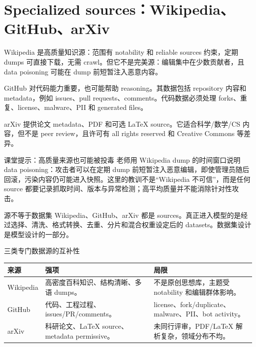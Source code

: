 \section{Specialized sources：Wikipedia、GitHub、arXiv}

Wikipedia 是高质量知识源：范围有 notability 和 reliable sources 约束，定期 dumps 可直接下载，无需 crawl。但它不是完美源：编辑集中在少数贡献者，且 data poisoning 可能在 dump 前短暂注入恶意内容。

GitHub 对代码能力重要，也可能帮助 reasoning。其数据包括 repository 内容和 metadata，例如 issues、pull requests、comments。代码数据必须处理 forks、重复、license、malware、PII 和 generated files。

arXiv 提供论文 metadata、PDF 和可选 LaTeX source。它适合科学/数学/CS 内容，但不是 peer review，且许可有 all rights reserved 和 Creative Commons 等差异。

\begin{warningbox}{课堂提示：高质量来源也可能被投毒}
老师用 Wikipedia dump 的时间窗口说明 data poisoning：攻击者可以在定期 dump 前短暂注入恶意编辑，即使管理员随后回滚，污染内容仍可能进入快照。这里的教训不是“Wikipedia 不可信”，而是任何 source 都要记录抓取时间、版本与异常检测；高平均质量并不能消除针对性攻击。
\end{warningbox}

\begin{importantbox}{源不等于数据集}
Wikipedia、GitHub、arXiv 都是 sources。真正进入模型的是经过选择、清洗、格式转换、去重、分片和混合权重设定后的 datasets。数据集设计是模型设计的一部分。
\end{importantbox}

\begin{knowledgebox}{三类专门数据源的互补性}
\begin{tabular}{L{0.18\textwidth}L{0.32\textwidth}L{0.4\textwidth}}
\toprule
来源 & 强项 & 局限 \\
\midrule
Wikipedia & 高密度百科知识、结构清晰、多语 dumps。 & 不是原创思想库，主题受 notability 和编辑群体影响。 \\
GitHub & 代码、工程过程、issues/PR/comments。 & license、fork/duplicate、malware、PII、bot activity。 \\
arXiv & 科研论文、LaTeX source、metadata permissive。 & 未同行评审，PDF/LaTeX 解析复杂，领域分布不均。 \\
\bottomrule
\end{tabular}
\end{knowledgebox}

